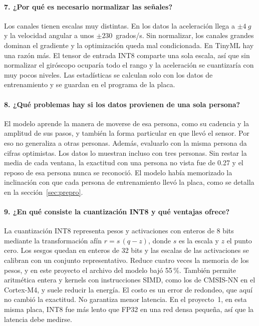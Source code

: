 \documentclass[11pt,a4paper]{article}
\begin{document}
\paragraph{7. ¿Por qué es necesario normalizar las señales?}
Los canales tienen escalas muy distintas. En los datos la aceleración llega a $\pm4~g$ y la velocidad angular a unos $\pm230$~grados/s. Sin normalizar, los canales grandes dominan el gradiente y la optimización queda mal condicionada. En TinyML hay una razón más. El tensor de entrada INT8 comparte una sola escala, así que sin normalizar el giróscopo ocuparía todo el rango y la aceleración se cuantizaría con muy pocos niveles. Las estadísticas se calculan solo con los datos de entrenamiento y se guardan en el programa de la placa.

\paragraph{8. ¿Qué problemas hay si los datos provienen de una sola persona?}
El modelo aprende la manera de moverse de esa persona, como su cadencia y la amplitud de sus pasos, y también la forma particular en que llevó el sensor. Por eso no generaliza a otras personas. Además, evaluarlo con la misma persona da cifras optimistas. Los datos lo muestran incluso con tres personas. Sin restar la media de cada ventana, la exactitud con una persona no vista fue de 0.27 y el reposo de esa persona nunca se reconoció. El modelo había memorizado la inclinación con que cada persona de entrenamiento llevó la placa, como se detalla en la sección~\ref{sec:prepro}.

\paragraph{9. ¿En qué consiste la cuantización INT8 y qué ventajas ofrece?}
La cuantización INT8 representa pesos y activaciones con enteros de 8 bits mediante la transformación afín $r = s\,(q - z)$, donde $s$ es la escala y $z$ el punto cero. Los sesgos quedan en enteros de 32 bits y las escalas de las activaciones se calibran con un conjunto representativo. Reduce cuatro veces la memoria de los pesos, y en este proyecto el archivo del modelo bajó 55\,\%. También permite aritmética entera y kernels con instrucciones SIMD, como los de CMSIS-NN en el Cortex-M4, y suele reducir la energía. El costo es un error de redondeo, que aquí no cambió la exactitud. No garantiza menor latencia. En el proyecto~1, en esta misma placa, INT8 fue más lento que FP32 en una red densa pequeña, así que la latencia debe medirse.
\end{document}
